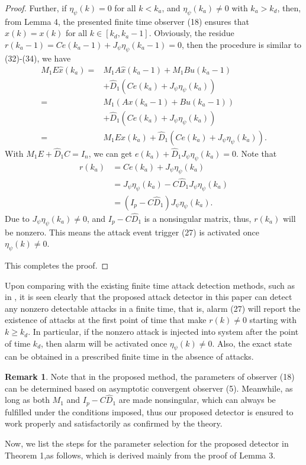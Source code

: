 \documentclass[english]{cccconf}
\theoremstyle{definition}
\newtheorem{remark}{Remark}
\begin{document}
\begin{proof}
Further, if $\eta_\psi(k)=0$ for all $k<k_a$, and $\eta_\psi(k_a)\neq 0$ with $k_a> k_d$, then, from Lemma 4, the presented finite time observer (18) ensures that $\hat{x}(k)=x(k)$  for all $k\in [k_d,k_a-1]$. Obviously, the residue $r(k_a-1)=Ce(k_a-1)+J_{\psi}\eta_\psi(k_a-1)=0$, then the procedure is similar to (32)-(34), we have
\begin{align}
M_1E\hat{x}(k_a)=&M_1A\hat{x}(k_a-1)+M_1Bu(k_a-1)\nonumber\\&+\hat{D}_1(Ce(k_a)+J_{\psi}\eta_\psi(k_a))\nonumber\\
=&M_1(Ax(k_a-1)+Bu(k_a-1))\\
&+\hat{D}_1(Ce(k_a)+J_{\psi}\eta_\psi(k_a))\nonumber\\
=&M_1Ex(k_a)+\hat{D}_1(Ce(k_a)+J_{\psi}\eta_\psi(k_a))\nonumber.
\end{align}
With $M_1E+\hat{D}_1C=I_n$, we can get $e(k_a)+\hat{D}_1J_{\psi}\eta_\psi(k_a)=0$. 
Note that
\begin{equation}\begin{split}
r(k_a)&=Ce(k_a)+J_{\psi}\eta_\psi(k_a)\\
&=J_{\psi}\eta_\psi(k_a)-C\hat{D}_1J_{\psi}\eta_\psi(k_a)\\
&=(I_p-C\hat{D}_1)J_{\psi}\eta_\psi(k_a).
\end{split}\end{equation}
Due to $J_{\psi}\eta_\psi(k_a)\neq 0$, and $I_p-C\hat{D}_1$ is a  nonsingular matrix, thus, $r(k_a)$ will be nonzero. This means the attack event trigger (27) is activated once $\eta_\psi(k)\neq 0$. 

This completes the proof.
\end{proof}
Upon comparing with the  existing finite time attack detection methods, such as in \cite{Fawzi2012Secure}, it is seen clearly that the proposed attack detector in this paper can detect any nonzero detectable attacks in a finite time, that is, alarm (27) will report the existence of attacks at the first point of time that make $r(k)\neq 0$ starting with $k\geq k_d$. In particular, if the nonzero attack is injected into system after the point of time $k_d$, then alarm will be activated once $\eta_\psi(k)\neq 0$. Also, the exact state can be obtained in a prescribed finite time in the absence of attacks. 
\begin{remark} Note that in the proposed method, the parameters of observer (18) can be determined based on asymptotic convergent observer (5). Meanwhile, as long as both $M_1$ and $I_p-C\hat{D}_1$  are made nonsingular, which can always be fulfilled under the conditions imposed, thus our proposed detector is ensured to work properly and satisfactorily as confirmed by the theory.
\end{remark}
Now, we list the steps for the parameter selection for the proposed detector in Theorem 1,as follows, which is derived mainly from the proof of Lemma 3.
\end{document}
